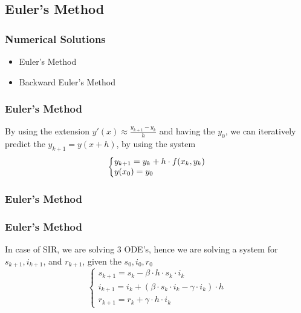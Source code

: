 \documentclass{beamer}
\makeatletter
\newenvironment{system}%
{\left\lbrace\begin{array}{@{}l@{}}}%
{\end{array}\right.}
\makeatother
\begin{document}
\subsection{Euler's Method}

\begin{frame}\frametitle{Numerical Solutions}
\begin{itemize}
\item Euler's Method
\item Backward Euler's Method
\end{itemize}
\end{frame}

\begin{frame}\frametitle{Euler's Method}
    By using the extension $y'(x) \approx \frac{y_{k+1}-y_{k}}{h}$ and having the
$y_0$, we can iteratively predict the $y_{k+1}=y(x+h)$, by using the system
\vspace{1.5cm}
\large
\begin{equation*}
    \begin{system}
	    y_{k+1} = y_k + h\cdot f(x_k,y_k)
        \\
        y(x_0)=y_0
    \end{system}
\end{equation*}

\end{frame}

\begin{frame}\frametitle{Euler's Method}

\end{frame}

\begin{frame}\frametitle{Euler's Method}
In case of SIR, we are solving 3 ODE's, hence we are solving a system
for $s_{k+1}, i_{k+1}$, and $r_{k+1}$, given the $s_0, i_0, r_0$
\vspace{0.7cm}
\Large
\[
	\left\{
		\begin{array}{l}
			s_{k+1}=s_k - \beta \cdot h \cdot s_k \cdot i_k \\
			i_{k+1}=i_k + (\beta \cdot s_k \cdot i_k - \gamma \cdot i_k) \cdot h \\
			r_{k+1}=r_k+ \gamma \cdot h \cdot i_k
		\end{array}
	\right.
\]
\end{frame}
\end{document}
